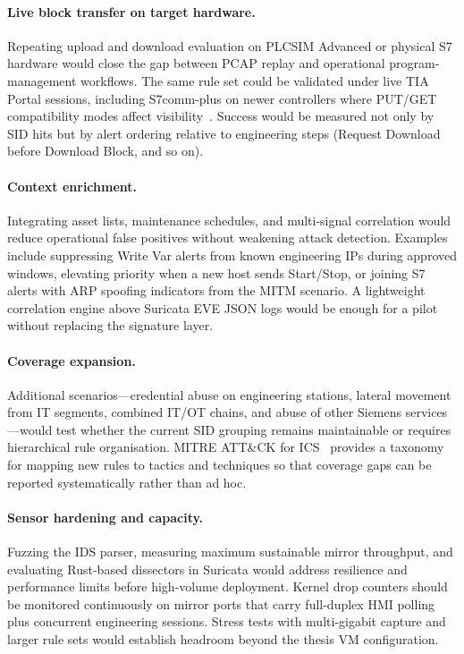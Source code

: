 \documentclass[../main.tex]{subfiles}
\begin{document}
\paragraph{Live block transfer on target hardware.}
Repeating upload and download evaluation on PLCSIM Advanced or physical S7 hardware would close the gap between PCAP replay and operational program-management workflows. The same rule set could be validated under live TIA Portal sessions, including S7comm-plus on newer controllers where PUT/GET compatibility modes affect visibility~\cite{industrialmonitordirect_s7comm_plus}. Success would be measured not only by SID hits but by alert ordering relative to engineering steps (Request Download before Download Block, and so on).

\paragraph{Context enrichment.}
Integrating asset lists, maintenance schedules, and multi-signal correlation would reduce operational false positives without weakening attack detection. Examples include suppressing Write Var alerts from known engineering IPs during approved windows, elevating priority when a new host sends Start/Stop, or joining S7 alerts with ARP spoofing indicators from the MITM scenario. A lightweight correlation engine above Suricata EVE JSON logs would be enough for a pilot without replacing the signature layer.

\paragraph{Coverage expansion.}
Additional scenarios---credential abuse on engineering stations, lateral movement from IT segments, combined IT/OT chains, and abuse of other Siemens services---would test whether the current SID grouping remains maintainable or requires hierarchical rule organisation. MITRE ATT\&CK for ICS~\cite{mitre_ics_attack} provides a taxonomy for mapping new rules to tactics and techniques so that coverage gaps can be reported systematically rather than ad hoc.

\paragraph{Sensor hardening and capacity.}
Fuzzing the IDS parser, measuring maximum sustainable mirror throughput, and evaluating Rust-based dissectors in Suricata would address resilience and performance limits before high-volume deployment. Kernel drop counters should be monitored continuously on mirror ports that carry full-duplex HMI polling plus concurrent engineering sessions. Stress tests with multi-gigabit capture and larger rule sets would establish headroom beyond the thesis VM configuration.
\end{document}

